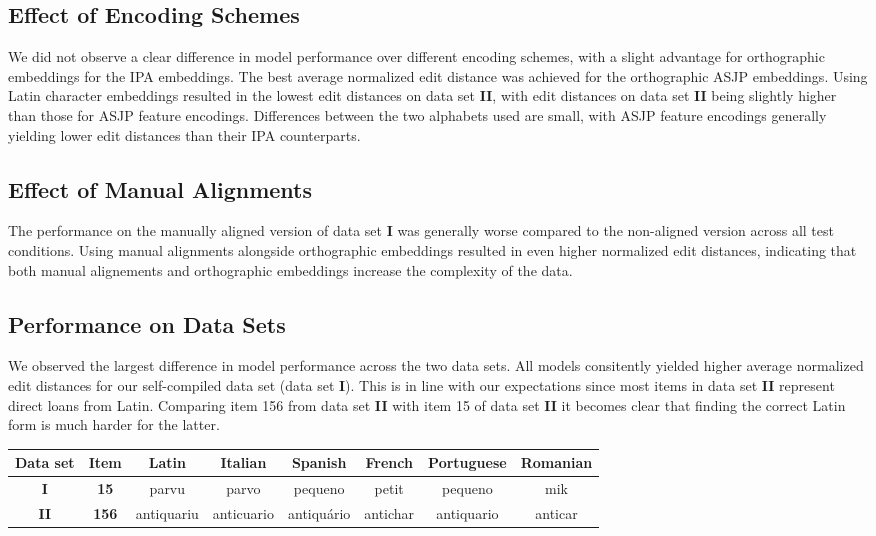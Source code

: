 \subsection{Effect of Encoding Schemes}
We did not observe a clear difference in model performance over different encoding schemes, with a slight advantage for orthographic embeddings for the IPA embeddings. The best average normalized edit distance was achieved for the orthographic ASJP embeddings. Using Latin character embeddings resulted in the lowest edit distances on data set \textbf{II}, with edit distances on data set \textbf{II} being slightly higher than those for ASJP feature encodings.
Differences between the two alphabets used are small, with ASJP feature encodings generally yielding lower edit distances than their IPA counterparts.

\subsection{Effect of Manual Alignments}
The performance on the manually aligned version of data set \textbf{I} was generally worse compared to the non-aligned version across all test conditions. 
Using manual alignments alongside orthographic embeddings resulted in even higher normalized edit distances, indicating that both manual alignements and orthographic embeddings increase the complexity of the data.

\subsection{Performance on Data Sets}
We observed the largest difference in model performance across the two data sets. All models consitently yielded higher average normalized edit distances for our self-compiled data set (data set \textbf{I}). This is in line with our expectations since most items in data set \textbf{II} represent direct loans from Latin. Comparing item 156 from data set \textbf{II} with item 15 of data set \textbf{II} it becomes clear that finding the correct Latin form is much harder for the latter.

\begin{tabular}{cc|cccccc}
     \textbf{Data set} & \textbf{Item} & Latin & Italian & Spanish & French & Portuguese & Romanian \\
     \hline
     \textbf{I} & \textbf{15} & parvu & parvo & pequeno & petit & pequeno & mik \\
     \textbf{II} & \textbf{156} & antiquariu & anticuario & antiquário & antichar & antiquario & anticar  
\end{tabular}

